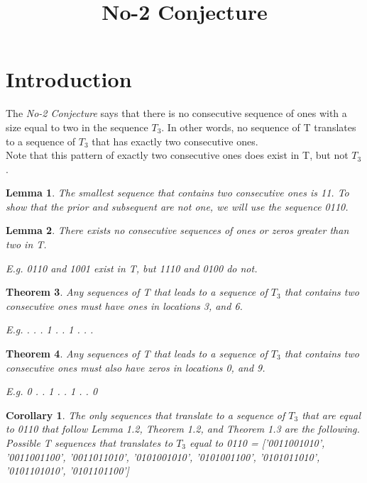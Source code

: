\documentclass[12pt]{article}
\title{ No-2 Conjecture }
\newtheorem{theorem}{Theorem}[section]
\newtheorem{corollary}{Corollary}[theorem]
\newtheorem{lemma}[theorem]{Lemma}
\begin{document}
\maketitle

\section{Introduction}
The \textit{No-2 Conjecture} says that there is no consecutive sequence of ones with a size equal to two in the sequence $T_3$. In other words, no sequence of T translates to a sequence of $T_3$ that has exactly two consecutive ones.\\

Note that this pattern of exactly two consecutive ones does exist in T, but not $T_3$.

\begin{lemma}
The smallest sequence that contains two consecutive ones is 11. To show that the prior and subsequent are not one, we will use the sequence 0110.
\end{lemma}

\begin{lemma}
There exists no consecutive sequences of ones or zeros greater than two in T.

E.g. 0110 and 1001 exist in T, but 1110 and 0100 do not.
\end{lemma}

\begin{theorem}
Any sequences of T that leads to a sequence of $T_3$ that contains two consecutive ones must have ones in locations 3, and 6.

E.g. . . . 1 . . 1 . . .
\end{theorem}

\begin{theorem}
Any sequences of T that leads to a sequence of $T_3$ that contains two consecutive ones must also have zeros in locations 0, and 9.

E.g. 0 . . 1 . . 1 . . 0
\end{theorem}

\begin{corollary}
The only sequences that translate to a sequence of $T_3$ that are equal to 0110 that follow Lemma 1.2, Theorem 1.2, and Theorem 1.3 are the following. \\

Possible T sequences that translates to $T_3$ equal to 0110 = ['0011001010',
 '0011001100',
 '0011011010',
 '0101001010',
 '0101001100',
 '0101011010',
 '0101101010',
 '0101101100']

\end{corollary}
\end{document}
